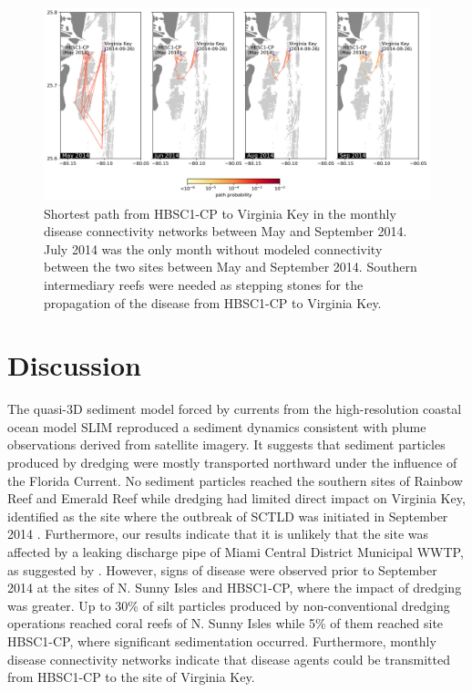 \documentclass[preprint,12pt,authoryear]{elsarticle}
\begin{document}
\begin{figure}
	\centering
	\includegraphics[width=\textwidth]{figures/fig_paths.png}
	\caption{Shortest path from HBSC1-CP to Virginia Key in the monthly disease connectivity networks between May and September 2014. July 2014 was the only month without modeled connectivity between the two sites between May and September 2014. Southern intermediary reefs were needed as stepping stones for the propagation of the disease from HBSC1-CP to Virginia Key.}
	\label{fig:onset_path}
\end{figure}

\section{Discussion}

The quasi-3D sediment model forced by currents from the high-resolution coastal ocean model SLIM reproduced a sediment dynamics consistent with plume observations derived from satellite imagery. It suggests that sediment particles produced by dredging were mostly transported northward under the influence of the Florida Current. No sediment particles reached the southern sites of Rainbow Reef and Emerald Reef while dredging had limited direct impact on Virginia Key, identified as the site where the outbreak of SCTLD was initiated in September 2014 \citep{precht2016unprecedented}. Furthermore, our results indicate that it is unlikely that the site was affected by a leaking discharge pipe of Miami Central District Municipal WWTP, as suggested by \cite{gintert2019regional}. However, signs of disease were observed prior to September 2014 at the sites of N. Sunny Isles and HBSC1-CP, where the impact of dredging was greater. Up to 30\% of silt particles produced by non-conventional dredging operations reached coral reefs of N. Sunny Isles while 5\% of them reached site HBSC1-CP, where significant sedimentation occurred. Furthermore, monthly disease connectivity networks indicate that disease agents could be transmitted from HBSC1-CP to the site of Virginia Key.   
\end{document}
